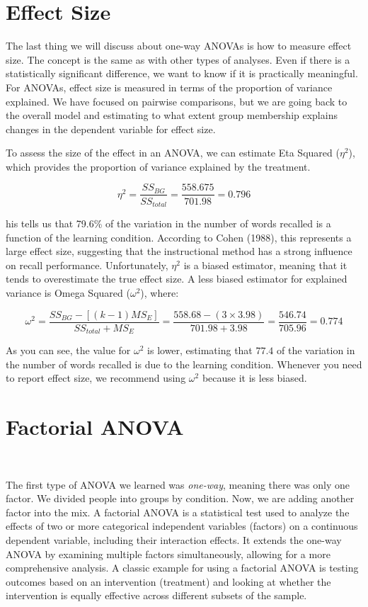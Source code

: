 \documentclass[
  letterpaper,
  DIV=11,
  numbers=noendperiod]{scrreprt}
\begin{document}
\section{Effect Size}\label{effect-size}

The last thing we will discuss about one-way ANOVAs is how to measure
effect size. The concept is the same as with other types of analyses.
Even if there is a statistically significant difference, we want to know
if it is practically meaningful. For ANOVAs, effect size is measured in
terms of the proportion of variance explained. We have focused on
pairwise comparisons, but we are going back to the overall model and
estimating to what extent group membership explains changes in the
dependent variable for effect size.

To assess the size of the effect in an ANOVA, we can estimate Eta
Squared (\(\eta^2\)), which provides the proportion of variance
explained by the treatment.

\[
\eta^2 = \frac{SS_{BG}}{SS_{total}} = \frac{558.675}{701.98} = 0.796
\]

his tells us that 79.6\% of the variation in the number of words
recalled is a function of the learning condition. According to Cohen
(1988), this represents a large effect size, suggesting that the
instructional method has a strong influence on recall performance.
Unfortunately, \(\eta^2\) is a biased estimator, meaning that it tends
to overestimate the true effect size. A less biased estimator for
explained variance is Omega Squared (\(\omega^2\)), where:

\[
\omega^2 = \frac{SS_{BG} - [(k - 1)MS_E]}{SS_{total} + MS_E}
= \frac{558.68 - (3 \times 3.98)}{701.98 + 3.98}
= \frac{546.74}{705.96}
= 0.774
\]

As you can see, the value for \(\omega^2\) is lower, estimating that
\(77.4%
\) of the variation in the number of words recalled is due to the
learning condition. Whenever you need to report effect size, we
recommend using \(\omega^2\) because it is less biased.

\section{Factorial ANOVA\,}\label{factorial-anova}

\,

The first type of ANOVA we learned was \emph{one-way}, meaning there was
only one factor. We divided people into groups by condition. Now, we are
adding another factor into the mix. A factorial ANOVA is a statistical
test used to analyze the effects of two or more categorical independent
variables (factors) on a continuous dependent variable, including their
interaction effects. It extends the one-way ANOVA by examining multiple
factors simultaneously, allowing for a more comprehensive analysis. A
classic example for using a factorial ANOVA is testing outcomes based on
an intervention (treatment) and looking at whether the intervention is
equally effective across different subsets of the sample.
\end{document}
